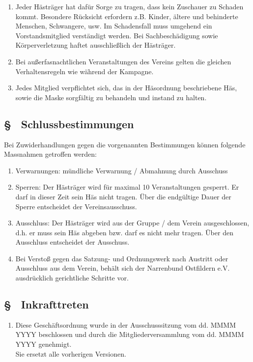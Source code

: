 \begin{enumerate}
    \item \label{go:abs:lubbg9} Jeder Hästräger hat dafür Sorge zu tragen, dass kein Zuschauer zu Schaden kommt. Besondere Rücksicht erfordern z.B. Kinder, ältere und behinderte Menschen, Schwangere, usw. Im Schadensfall muss umgehend ein Vorstandsmitglied verständigt werden. Bei Sachbeschädigung sowie Körperverletzung haftet ausschließlich der Hästräger.

    \item \label{go:abs:qq8m3q} Bei außerfasnachtlichen Veranstaltungen des Vereins gelten die gleichen Verhaltensregeln wie während der Kampagne.

    \item \label{go:abs:bp91kr} Jedes Mitglied verpflichtet sich, das in der Häsordnung beschriebene Häs, sowie die Maske sorgfältig zu behandeln und instand zu halten.
\end{enumerate}

\subsection{§ \thegoparagraphcounter\ Schlussbestimmungen} \label{go:par:schlussbestimmungen}
Bei Zuwiderhandlungen gegen die vorgenannten Bestimmungen können folgende Massnahmen
getroffen werden:
\begin{enumerate}
    \item \label{go:abs:fomeo1} Verwarnungen: mündliche Verwarnung / Abmahnung durch Ausschuss

    \item \label{go:abs:ug83mo} Sperren: Der Hästräger wird für maximal 10 Veranstaltungen gesperrt. Er darf in dieser Zeit sein Häs nicht tragen. Über die endgültige Dauer der Sperre entscheidet der Vereinsausschuss.

    \item \label{go:abs:17lqc7} Ausschluss: Der Hästräger wird aus der Gruppe / dem Verein ausgeschlossen, d.h. er muss sein Häs abgeben bzw. darf es nicht mehr tragen. Über den Ausschluss entscheidet der Ausschuss.

    \item \label{go:abs:4czlee} Bei Verstoß gegen das Satzung- und Ordnungswerk nach Austritt oder Ausschluss aus dem Verein, behält sich der Narrenbund Ostfildern e.V. ausdrücklich gerichtliche Schritte vor. 
\end{enumerate}

\subsection{§ \thegoparagraphcounter\ Inkrafttreten} \label{go:par:inkrafttreten}
\begin{enumerate}
    \item \label{go:abs:hsdf7s} Diese Geschäftsordnung wurde in der Ausschusssitzung vom dd. MMMM YYYY beschlossen und durch die Mitgliederversammlung vom dd. MMMM YYYY genehmigt. \\
    Sie ersetzt alle vorherigen Versionen.
\end{enumerate}